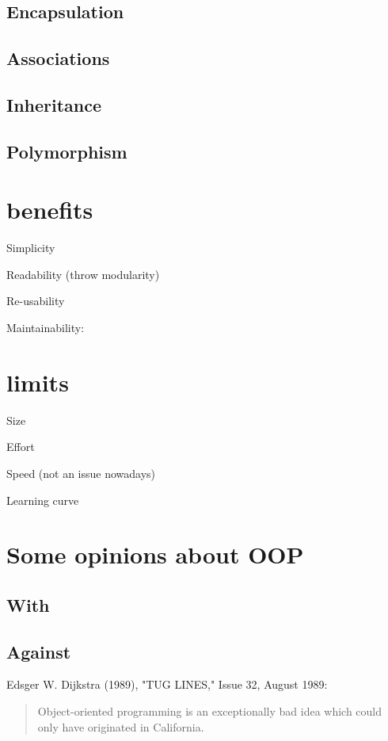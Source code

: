 \documentclass[12pt]{book}
\begin{document}
\subsection{Encapsulation}

\subsection{Associations}

\subsection{Inheritance}

\subsection{Polymorphism}


\section{benefits}


Simplicity

Readability (throw modularity)

Re-usability

Maintainability: 


\section{limits}

Size 

Effort

Speed (not an issue nowadays)

Learning curve


\section{Some opinions about OOP}

\subsection{With}

\subsection{Against}

Edsger W. Dijkstra (1989), "TUG LINES," Issue 32, August 1989:
\begin{quote}
	Object-oriented programming is an exceptionally bad idea which could only have originated in California.
\end{quote}
\end{document}
